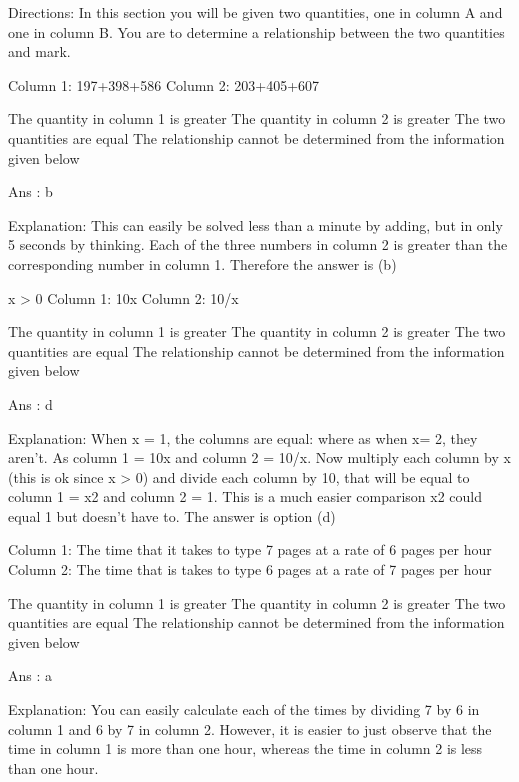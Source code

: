 


Directions:
In this section you will be given two quantities, one in column A and one in column B. You are to determine a relationship between the two quantities and mark.

    Column 1: 197+398+586
    Column 2: 203+405+607

        The quantity in column 1 is greater
        The quantity in column 2 is greater
        The two quantities are equal
        The relationship cannot be determined from the information given below 

    Ans : b

    Explanation:
    This can easily be solved less than a minute by adding, but in only 5 seconds by thinking. Each of the three numbers in column 2 is greater than the corresponding number in column 1. Therefore the answer is (b)

    x > 0
    Column 1: 10x
    Column 2: 10/x

        The quantity in column 1 is greater
        The quantity in column 2 is greater
        The two quantities are equal
        The relationship cannot be determined from the information given below 

    Ans : d

    Explanation:
    When x = 1, the columns are equal: where as when x= 2, they aren’t. As column 1 = 10x and column 2 = 10/x. Now multiply each column by x (this is ok since x > 0) and divide each column by 10, that will be equal to column 1 = x2 and column 2 = 1. This is a much easier comparison x2 could equal 1 but doesn’t have to. The answer is option (d)

    Column 1: The time that it takes to type 7 pages at a rate of 6 pages per hour
    Column 2: The time that is takes to type 6 pages at a rate of 7 pages per hour

        The quantity in column 1 is greater
        The quantity in column 2 is greater
        The two quantities are equal
        The relationship cannot be determined from the information given below 

    Ans : a

    Explanation:
    You can easily calculate each of the times by dividing 7 by 6 in column 1 and 6 by 7 in column 2. However, it is easier to just observe that the time in column 1 is more than one hour, whereas the time in column 2 is less than one hour.


